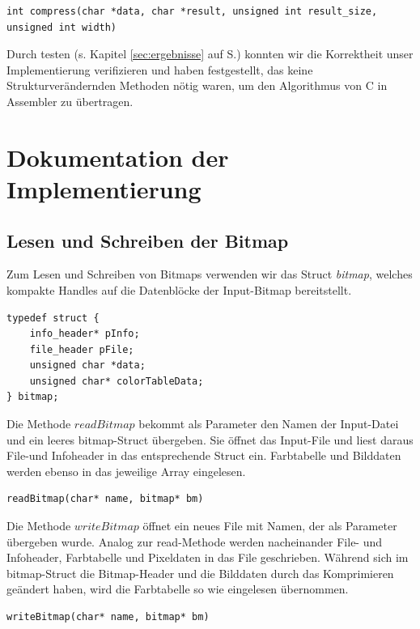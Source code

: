 \documentclass[11pt]{scrartcl}
\begin{document}
\lstset{language=C, basicstyle=\small,  numbers=left, numberstyle=\tiny}
\begin{lstlisting}[caption={Endgültige Signatur der compress-Methode},frame=single, captionpos=b, label=code-comm-task, xleftmargin=.03\textwidth]
int compress(char *data, char *result, unsigned int result_size, unsigned int width)
\end{lstlisting}
Durch testen (s. Kapitel \ref{sec:ergebnisse} auf S.\pageref{sec:ergebnisse}) konnten wir die Korrektheit unser Implementierung verifizieren und haben festgestellt, das keine Strukturverändernden Methoden nötig waren, um den Algorithmus von C in Assembler zu übertragen.


\section{Dokumentation der Implementierung}


\subsection{Lesen und Schreiben der Bitmap}

Zum Lesen und Schreiben von Bitmaps verwenden wir das Struct \textit{bitmap}, welches kompakte Handles auf die Datenblöcke der Input-Bitmap bereitstellt.


\begin{lstlisting}[caption={Struct: bitmap},frame=single, captionpos=b, label=code-comm-task, xleftmargin=.03\textwidth]
typedef struct {
	info_header* pInfo;
	file_header pFile;
	unsigned char *data;
	unsigned char* colorTableData;
} bitmap;

\end{lstlisting}



Die Methode  $readBitmap$   bekommt als Parameter den Namen der Input-Datei und ein leeres bitmap-Struct übergeben. Sie öffnet das Input-File und liest daraus File-und Infoheader in das entsprechende Struct ein. Farbtabelle und Bilddaten werden ebenso in das jeweilige Array eingelesen.\\
\begin{lstlisting}[caption={Signatur der Methode readBitmap},frame=single, captionpos=b, label=code-comm-task, xleftmargin=.03\textwidth]
readBitmap(char* name, bitmap* bm)
\end{lstlisting}


Die Methode $writeBitmap$ öffnet ein neues File mit Namen, der als Parameter übergeben wurde. Analog zur read-Methode werden nacheinander File- und Infoheader, Farbtabelle und Pixeldaten in das File geschrieben. Während sich im bitmap-Struct die Bitmap-Header und die Bilddaten durch das Komprimieren geändert haben, wird die Farbtabelle so wie eingelesen übernommen.\\
\begin{lstlisting}[caption={Signatur der Methode writeBitmap},frame=single, captionpos=b, label=code-comm-task, xleftmargin=.03\textwidth]
writeBitmap(char* name, bitmap* bm)
\end{lstlisting}
\end{document}
